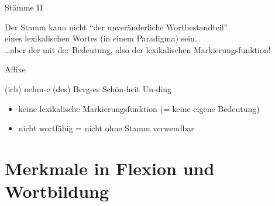 \begin{frame}
  {Stämme II}
  \begin{exe}
    \ex
    \begin{xlist}
        \pause
        \pause
    \end{xlist}
  \end{exe}
  \pause
  \pause
  \pause
  \pause
  \pause
  Der \alert{Stamm} kann nicht "`der unveränderliche Wortbestandteil"'\\
  eines lexikalischen Wortes (in einem Paradigma) sein.\\
  \Zeile
  \pause
  \alert{\dots aber der mit der Bedeutung, also der lexikalischen Markierungsfunktion}!
\end{frame}

\begin{frame}
  {Affixe}
  \pause
  \begin{exe}
    \ex
    \begin{xlist}
      \ex (ich) nehm\alert<6->{-e}
      \pause
      \ex (des) Berg\alert<7->{-es}
      \pause
      \ex Schön\alert<8->{-heit}
      \pause
      \ex \alert<9->{Un-}ding
    \end{xlist}
  \end{exe}
  \Zeile
  \pause
  \pause
  \pause
  \pause
  \pause
  \begin{itemize}[<+->]
    \item \alert{keine lexikalische Markierungsfunktion} (= keine eigene Bedeutung)
    \item \alert{nicht wortfähig} = nicht ohne Stamm verwendbar
  \end{itemize}
\end{frame}



\section{Merkmale in Flexion und Wortbildung}


